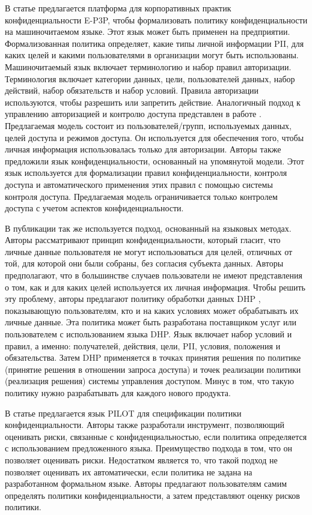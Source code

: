 \documentclass[../main]{subfiles}
\begin{document}
В статье \cite{MDPI11} предлагается платформа для корпоративных практик конфиденциальности E-P3P, чтобы формализовать политику конфиденциальности на машиночитаемом языке. Этот язык может быть применен на предприятии. Формализованная политика определяет, какие типы личной информации PII, для каких целей и какими пользователями в организации могут быть использованы. Машиночитаемый язык включает терминологию и набор правил авторизации. Терминология включает категории данных, цели, пользователей данных, набор действий, набор обязательств и набор условий. Правила авторизации используются, чтобы разрешить или запретить действие. Аналогичный подход к управлению авторизацией и контролю доступа представлен в работе \cite{MDPI12}. Предлагаемая модель состоит из пользователей/групп, используемых данных, целей доступа и режимов доступа. Он используется для обеспечения того, чтобы личная информация использовалась только для авторизации. Авторы \cite{MDPI12} также предложили язык конфиденциальности, основанный на упомянутой модели. Этот язык используется для формализации правил конфиденциальности, контроля доступа и автоматического применения этих правил с помощью системы контроля доступа. Предлагаемая модель ограничивается только контролем доступа с учетом аспектов конфиденциальности.

В публикации \cite{MDPI13} так же используется подход, основанный на языковых методах. Авторы \cite{MDPI13} рассматривают принцип конфиденциальности, который гласит, что личные данные пользователя не могут использоваться для целей, отличных от той, для которой они были собраны, без согласия субъекта данных. Авторы \cite{MDPI13} предполагают, что в большинстве случаев пользователи не имеют представления о том, как и для каких целей используется их личная информация. Чтобы решить эту проблему, авторы предлагают политику обработки данных DHP \cite{MDPI13}, показывающую пользователям, кто и на каких условиях может обрабатывать их личные данные. Эта политика может быть разработана поставщиком услуг или пользователем с использованием языка DHP. Язык включает набор условий и правил, а именно: получателей, действия, цели, PII, условия, положения и обязательства. Затем DHP применяется в точках принятия решения по политике (принятие решения в отношении запроса доступа) и точек реализации политики (реализация решения) системы управления доступом. Минус в том, что такую ​​политику нужно разрабатывать для каждого нового продукта.

В статье \cite{MDPI14} предлагается язык PILOT для спецификации политики конфиденциальности. Авторы также разработали инструмент, позволяющий оценивать риски, связанные с конфиденциальностью, если политика определяется с использованием предложенного языка. Преимущество подхода в том, что он позволяет оценивать риски. Недостатком является то, что такой подход не позволяет оценивать их автоматически, если политика не задана на разработанном формальном языке. Авторы предлагают пользователям самим определять политики конфиденциальности, а затем представляют оценку рисков политики.
\end{document}
